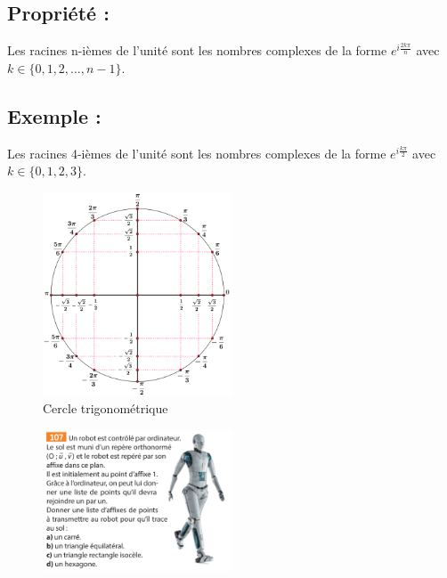 \documentclass[a4paper,12pt]{article}
\begin{document}
    \subsection{Propriété :} Les racines n-ièmes de l'unité sont les nombres complexes de la forme $e^{i\frac{2k\pi}{n}}$ avec $k \in \{0, 1, 2, \ldots, n-1\}$.
    \subsection{Exemple :} Les racines 4-ièmes de l'unité sont les nombres complexes de la forme $e^{i\frac{k\pi}{2}}$ avec $k \in \{0, 1, 2, 3\}$.

    \begin{figure}[h]
        \centering
        \includegraphics[width=0.5\textwidth]{cercletrigo.png}
        \caption{Cercle trigonométrique}
        \label{fig:cercle_trigo}
    \end{figure}
    \begin{figure}[h]
        \centering
        \includegraphics[width=0.5\textwidth]{exo2.png}
    \end{figure}
\end{document}
